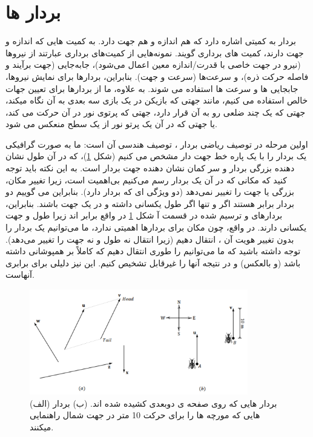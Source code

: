 \section{\textbf{بردار ها}}
{
    \Large
    \begin{spacing}{1.4}
        بردار به کمیتی اشاره دارد که هم اندازه و هم جهت دارد.
        به کمیت هایی که اندازه و جهت دارند، کمیت های برداری گویند.
        نمونه‌هایی از کمیت‌های برداری عبارتند از نیروها (نیرو در جهت خاصی با قدرت/اندازه معین اعمال می‌شود)، جابه‌جایی (جهت برآیند و فاصله حرکت ذره)، و سرعت‌ها (سرعت و جهت).
        بنابراین، بردارها برای نمایش نیروها، جابجایی ها و سرعت ها استفاده می شوند.
        به علاوه، ما از بردارها برای تعیین جهات خالص استفاده می کنیم،
        مانند جهتی که بازیکن در یک بازی سه بعدی به آن نگاه میکند،
        جهتی که یک چند ضلعی رو به آن قرار دارد، جهتی که پرتوی نور در آن حرکت می کند،
        یا جهتی که در آن یک پرتو نور از یک سطح منعکس می شود.

        اولین مرحله در توصیف ریاضی بردار ، توصیف هندسی آن است: ما به صورت گرافیکی یک بردار را با یک پاره خط جهت دار مشخص می کنیم (شکل \ref{fig:4.Session.1.1.1})، که در آن طول نشان دهنده بزرگی بردار و سر کمان نشان دهنده جهت بردار است.
        به این نکته باید توجه کنید که مکانی که در آن یک بردار رسم می‌کنیم بی‌اهمیت است، زیرا تغییر مکان، بزرگی یا جهت را تغییر نمی‌دهد (دو ویژگی ای که بردار دارد).
        بنابراین می گوییم دو بردار برابر هستند اگر و تنها اگر طول یکسانی داشته و در یک جهت باشند.
        بنابراین، بردارهای  و  ترسیم شده در قسمت آ شکل \ref{fig:4.Session.1.1.1} در واقع برابر اند زیرا طول و جهت یکسانی دارند.
        در واقع، چون مکان برای بردارها اهمیتی ندارد، ما می‌توانیم یک بردار را بدون تغییر هویت آن ، انتقال دهیم (زیرا انتقال نه طول و نه جهت را تغییر می‌دهد).
        توجه داشته باشید که ما می‌توانیم  را طوری انتقال دهیم که کاملاً بر  همپوشانی داشته باشد (و بالعکس) و در نتیجه آنها را غیرقابل تشخیص کنیم. این نیز دلیلی برای برابری آنهاست.

        \begin{figure}[H]
            \centering
            \setlength{\belowcaptionskip}{-10pt}
            \includegraphics[width=0.85\textwidth]{Images/4/4.Session.1.1.1}
            \caption{(الف) بردار هایی که روی صفحه ی دوبعدی کشیده شده اند.
                (ب) بردار هایی که مورچه ها را برای حرکت 10 متر در جهت شمال راهنمایی میکنند.}
            \label{fig:4.Session.1.1.1}
        \end{figure}


\end{spacing}}
